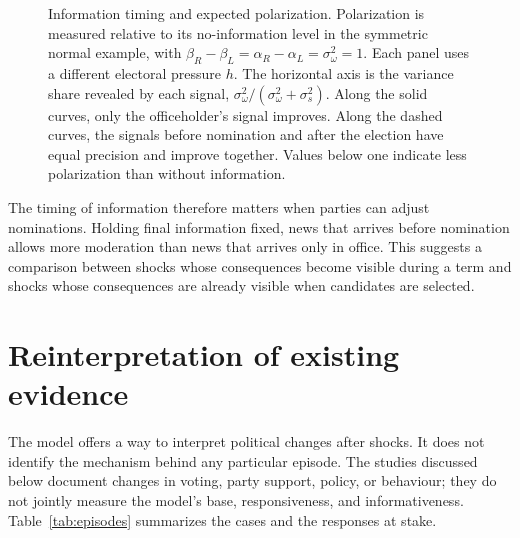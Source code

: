 \documentclass[12pt,letterpaper]{article}
\begin{document}
\begin{figure}[t]
\begin{subfigure}[b]{0.31\linewidth}
\end{subfigure}
\caption{Information timing and expected polarization. Polarization is measured relative to its no-information level in the symmetric normal example, with $\beta_R-\beta_L=\alpha_R-\alpha_L=\sigma_\omega^2=1$. Each panel uses a different electoral pressure $h$. The horizontal axis is the variance share revealed by each signal, $\sigma_\omega^2/(\sigma_\omega^2+\sigma_s^2)$. Along the solid curves, only the officeholder's signal improves. Along the dashed curves, the signals before nomination and after the election have equal precision and improve together. Values below one indicate less polarization than without information.}
\label{fig:sticky}
\end{figure}

The timing of information therefore matters when parties can adjust nominations. Holding final information fixed, news that arrives before nomination allows more moderation than news that arrives only in office. This suggests a comparison between shocks whose consequences become visible during a term and shocks whose consequences are already visible when candidates are selected.

\section{Reinterpretation of existing evidence}\label{sec:evidence}

The model offers a way to interpret political changes after shocks. It does not identify the mechanism behind any particular episode. The studies discussed below document changes in voting, party support, policy, or behaviour; they do not jointly measure the model's base, responsiveness, and informativeness. Table~\ref{tab:episodes} summarizes the cases and the responses at stake.
\end{document}
